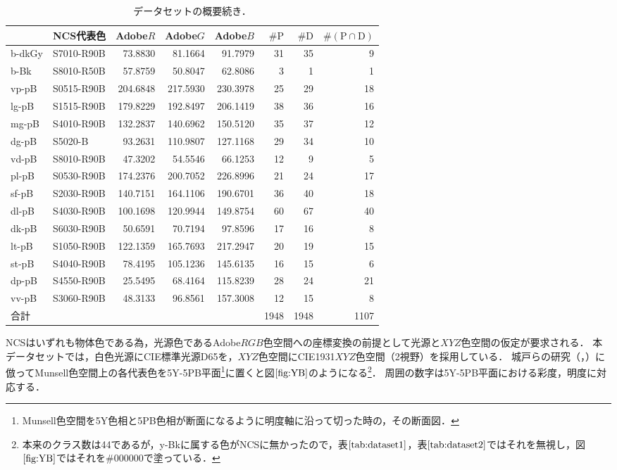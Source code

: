 \documentclass[uplatex,paper=a4,fontsize=4.0truemm,jafontsize=4.0truemm,head_space=30.0truemm,foot_space=30.0truemm,baselineskip=8.0truemm,line_length=40zw,gutter=25.0truemm,oneside,openany,fleqn,hanging_panctuation,open_bracket_pos=nibu_tentsuki,dvipdfmx,jis2004,book,titlepage]{jlreq}
\theoremstyle{mystyle}
\newcommand{\zwspace}{\hspace{1zw}\relax}
\newcommand{\captiondot}[1]{\caption{#1．}}
\newcommand{\tableinput}[4]{\begin{table}[btp]\centering\captiondot{#3}\label{tab:#4}\begin{tabular}{#1}#2\end{tabular}\end{table}}
\newcommand{\mathdisplaystyle}[1]{\(\displaystyle{#1}\)}
\newcommand{\Reference}[1]{\mathdisplaystyle{\ref{#1}}}
\newcommand{\parentheses}[1]{\left(#1\right)}
\begin{document}
			\tableinput{l|lrrrrrr}{ & NCS代表色 & Adobe\(R\) & Adobe\(G\) & Adobe\(B\) & \(\#\textrm{P}\) & \(\#\textrm{D}\) & \(\#\parentheses{\text{P}\cap\text{D}}\) \\ \hline
				b-dkGy & S7010-R90B & 73.8830 & 81.1664 & 91.7979 & 31 & 35 & 9 \\
				b-Bk & S8010-R50B & 57.8759 & 50.8047 & 62.8086 & 3 & 1 & 1 \\
				vp-pB & S0515-R90B & 204.6848 & 217.5930 & 230.3978 & 25 & 29 & 18 \\
				lg-pB & S1515-R90B & 179.8229 & 192.8497 & 206.1419 & 38 & 36 & 16 \\
				mg-pB & S4010-R90B & 132.2837 & 140.6962 & 150.5120 & 35 & 37 & 12 \\
				dg-pB & S5020-B & 93.2631 & 110.9807 & 127.1168 & 29 & 34 & 10 \\
				vd-pB & S8010-R90B & 47.3202 & 54.5546 & 66.1253 & 12 & 9 & 5 \\
				pl-pB & S0530-R90B & 174.2376 & 200.7052 & 226.8996 & 21 & 24 & 17 \\
				sf-pB & S2030-R90B & 140.7151 & 164.1106 & 190.6701 & 36 & 40 & 18 \\
				dl-pB & S4030-R90B & 100.1698 & 120.9944 & 149.8754 & 60 & 67 & 40 \\
				dk-pB & S6030-R90B & 50.6591 & 70.7194 & 97.8596 & 17 & 16 & 8 \\
				lt-pB & S1050-R90B & 122.1359 & 165.7693 & 217.2947 & 20 & 19 & 15 \\
				st-pB & S4040-R90B & 78.4195 & 105.1236 & 145.6135 & 16 & 15 & 6 \\
				dp-pB & S4550-R90B & 25.5495 & 68.4164 & 115.8239 & 28 & 24 & 21 \\
				vv-pB & S3060-R90B & 48.3133 & 96.8561 & 157.3008 & 12 & 15 & 8 \\ \hline
				合計 &  &  &  &  & 1948 & 1948 & 1107}{データセットの概要\zwspace 続き}{dataset2}

			NCSはいずれも物体色である為，光源色であるAdobe\mathdisplaystyle{RGB}色空間への座標変換の前提として光源と\mathdisplaystyle{XYZ}色空間の仮定が要求される．
			本データセットでは，白色光源にCIE標準光源D65を，\mathdisplaystyle{XYZ}色空間にCIE1931\mathdisplaystyle{XYZ}色空間（2\textdegree 視野）\cite[pp.~28--30]{Yaguchi2017a}を採用している．
			城戸らの研究（\cite[図1]{Kido2017}，\cite[図1]{Kido2018}）に倣ってMunsell色空間上の各代表色を5Y-5PB平面\footnote{Munsell色空間を5Y色相と5PB色相が断面になるように明度軸に沿って切った時の，その断面図．}に置くと図\Reference{fig:YB}のようになる\footnote{本来のクラス数は44であるが，y-Bkに属する色がNCSに無かったので，表\Reference{tab:dataset1}，表\Reference{tab:dataset2}ではそれを無視し，図\Reference{fig:YB}ではそれを\#000000で塗っている．}．
			周囲の数字は5Y-5PB平面における彩度，明度に対応する．
\end{document}
